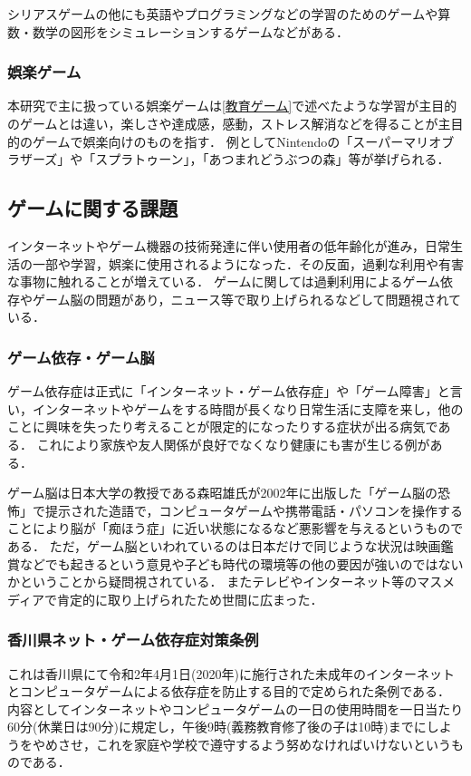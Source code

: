 \documentclass[12pt,a4j,titlepage]{ltjsarticle}
\begin{document}
シリアスゲームの他にも英語やプログラミングなどの学習のためのゲームや算数・数学の図形をシミュレーションするゲームなどがある．

\subsubsection{娯楽ゲーム}
本研究で主に扱っている娯楽ゲームは\ref{教育ゲーム}で述べたような学習が主目的のゲームとは違い，楽しさや達成感，感動，ストレス解消などを得ることが主目的のゲームで娯楽向けのものを指す．
例としてNintendoの「スーパーマリオブラザーズ」や「スプラトゥーン」，「あつまれどうぶつの森」等が挙げられる．

\subsection{ゲームに関する課題}
インターネットやゲーム機器の技術発達に伴い使用者の低年齢化が進み，日常生活の一部や学習，娯楽に使用されるようになった．その反面，過剰な利用や有害な事物に触れることが増えている．
ゲームに関しては過剰利用によるゲーム依存やゲーム脳の問題があり，ニュース等で取り上げられるなどして問題視されている．

\subsubsection{ゲーム依存・ゲーム脳}
ゲーム依存症は正式に「インターネット・ゲーム依存症」や「ゲーム障害」と言い，インターネットやゲームをする時間が長くなり日常生活に支障を来し，他のことに興味を失ったり考えることが限定的になったりする症状が出る病気である．
これにより家族や友人関係が良好でなくなり健康にも害が生じる例がある．

ゲーム脳は日本大学の教授である森昭雄氏が2002年に出版した「ゲーム脳の恐怖」\cite{ゲーム脳の恐怖}で提示された造語で，コンピュータゲームや携帯電話・パソコンを操作することにより脳が「痴ほう症」に近い状態になるなど悪影響を与えるというものである．
ただ，ゲーム脳といわれているのは日本だけで同じような状況は映画鑑賞などでも起きるという意見\cite{反ゲーム脳ITmedia}や子ども時代の環境等の他の要因が強いのではないか\cite{反ゲーム脳報告}ということから疑問視されている．
またテレビやインターネット等のマスメディアで肯定的に取り上げられたため\cite{ゲーム脳メディア}世間に広まった．

\subsubsection{香川県ネット・ゲーム依存症対策条例}
これは香川県にて令和2年4月1日(2020年)に施行された未成年のインターネットとコンピュータゲームによる依存症を防止する目的で定められた条例である．
内容としてインターネットやコンピュータゲームの一日の使用時間を一日当たり60分(休業日は90分)に規定し，午後9時(義務教育修了後の子は10時)までにしようをやめさせ，これを家庭や学校で遵守するよう努めなければいけないというものである．
\end{document}
